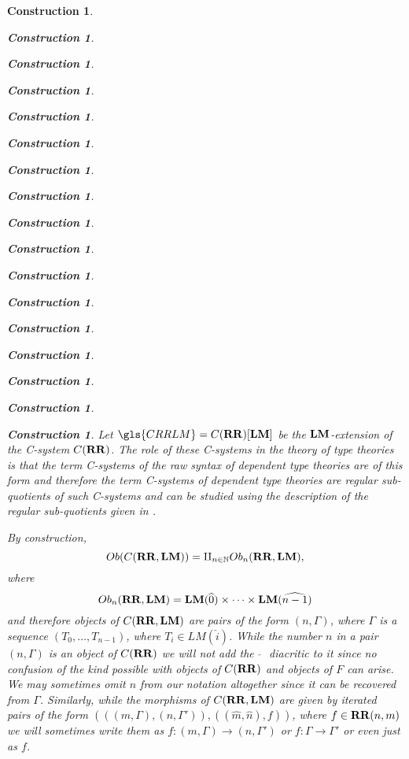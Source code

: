 \documentclass[onecolumn,12pt]{amsart}
\numberwithin{proposition}{subsection}
\newtheorem{construction}[proposition]{Construction}
\newcommand{\sr}{\rightarrow}
\newcommand{\nn}{{\mathbb N}}
\newcommand{\nat}{\nn}
\newcommand{\wh}{\widehat}
\newcommand{\RR}{{\bf RR}}
\newcommand{\LM}{{\bf LM}}
\begin{document}
\begin{construction}
\begin{construction}
\begin{construction}
\begin{construction}
\begin{construction}
\begin{construction}
\begin{construction}
\begin{construction}
\begin{construction}
\begin{construction}
\begin{construction}
\begin{construction}
\begin{construction}
\begin{construction}
\begin{construction}
\begin{construction}
\begin{construction}
Let $\gls{CRRLM}=C(\RR)[\LM]$ be the $\LM$-extension of the C-system
$C(\RR)$. The role of these C-systems in the theory of type theories is that
the term C-systems of the raw syntax of dependent type theories are of this
form and therefore the term C-systems of dependent type theories are regular
sub-quotients of such C-systems and can be studied using the description of the
regular sub-quotients given in \cite{Csubsystems}.

By construction,
%
\begin{equation}\label{2016.01.21.eq3}
Ob(C(\RR,\LM))=\amalg_{n\in\nat}Ob_n(\RR,\LM),
\end{equation}%
%
where 
%
$$Ob_n(\RR,\LM)=\LM(\wh{0})\times\dots\times\LM(\wh{n-1})$$
%
and therefore objects of $C(\RR,\LM)$ are pairs of the form $(n,\Gamma)$, where
$\Gamma$ is a sequence $(T_0,\dots,T_{n-1})$, where $T_i\in LM(\wh{i})$. While
the number $n$ in a pair $(n,\Gamma)$ is an object of $C(\RR)$ we will not add
the ${\,\,\wh{}\,\,}$ diacritic to it since no confusion of the kind possible
with objects of $C(\RR)$ and objects of $F$ can arise. We may sometimes omit $n$
from our notation altogether since it can be recovered from
$\Gamma$. Similarly, while the morphisms of $C(\RR,\LM)$ are given by iterated
pairs of the form $(((m,\Gamma),(n,\Gamma')),((\wh{m},\wh{n}),f))$, where $f\in
\RR(n,m)$ we will sometimes write them as $f:(m,\Gamma)\sr (n,\Gamma')$ or
$f:\Gamma\sr \Gamma'$ or even just as $f$.


\end{construction}
\end{construction}
\end{construction}
\end{construction}
\end{construction}
\end{construction}
\end{construction}
\end{construction}
\end{construction}
\end{construction}
\end{construction}
\end{construction}
\end{construction}
\end{construction}
\end{construction}
\end{construction}
\end{construction}
\end{document}
